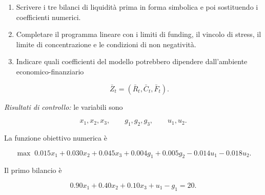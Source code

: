 \begin{exercise}
\begin{enumerate}
\item Scrivere i tre bilanci di liquidit\`a prima in forma simbolica e poi
sostituendo i coefficienti numerici.

\item Completare il programma lineare con i limiti di funding, il vincolo di
stress, il limite di concentrazione e le condizioni di non negativit\`a.

\item Indicare quali coefficienti del modello potrebbero dipendere
dall'ambiente economico-finanziario

\[
\bar Z_t=(\bar R_t,\bar C_t,\bar F_t).
\]

\end{enumerate}

\end{exercise}

\noindent
\textit{Risultati di controllo:} le variabili sono

\[
x_1,x_2,x_3,
\qquad
g_1,g_2,g_3,
\qquad
u_1,u_2.
\]

La funzione obiettivo numerica \`e

\[
\max\;
0.015x_1+0.030x_2+0.045x_3
+0.004g_1+0.005g_2
-0.014u_1-0.018u_2.
\]

Il primo bilancio \`e

\[
0.90x_1+0.40x_2+0.10x_3+u_1-g_1=20.
\]



